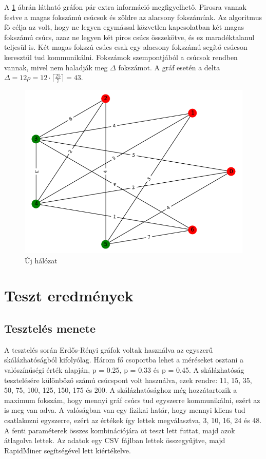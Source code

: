 \documentclass[12pt]{report}
\begin{document}
A \ref{routing-scheme} ábrán látható gráfon pár extra információ megfigyelhető. 
Pirosra vannak festve a magas fokszámú csúcsok és zöldre az alacsony fokszámúak.
Az algoritmus fő célja az volt, hogy ne legyen egymással közvetlen kapcsolatban két magas fokszámú csúcs, azaz ne legyen két piros csúcs összekötve, és ez maradéktalanul teljesül is.
Két magas fokszú csúcs csak egy alacsony fokszámú segítő csúcson keresztül tud kommunikálni.
Fokszámok szempontjából a csúcsok rendben vannak, mivel nem haladják meg $\Delta$ fokszámot. 
A gráf esetén a delta \(\Delta = 12\rho = 12 \cdot \lceil\frac{25}{7}\rceil = 43  \).

\begin{figure}[h]
	\begin{center}
		\includegraphics[width=0.49\linewidth]{pictures/new_network.png}
		\caption{Új hálózat}
		\label{routing-scheme}
	\end{center}
\end{figure}

\chapter{Teszt eredmények}

\section{Tesztelés menete}

A tesztelés során Erdős-Rényi gráfok voltak használva az egyszerű skálázhatóságból kifolyólag.
Három fő csoportba lehet a méréseket osztani a valószínűségi érték alapján, p = 0.25, p = 0.33 és p = 0.45.
A skálázhatóság tesztelésére különböző számú csúcspont volt használva, ezek rendre: 11, 15, 35, 50, 75, 100, 125, 150, 175 és 200.
A skálázhatósághoz még hozzátartozik a maximum fokszám, hogy mennyi gráf csúcs tud egyszerre kommunikálni, ezért az is meg van adva.
A valóságban van egy fizikai határ, hogy mennyi kliens tud csatlakozni egyszerre, ezért az értékek így lettek megválasztva, 3, 10, 16, 24 és 48.
A fenti paraméterek összes kombinációjára öt teszt lett futtat, majd azok átlagolva lettek.
Az adatok egy CSV fájlban lettek összegyűjtve, majd RapidMiner segítségével lett kiértékelve.
\end{document}
